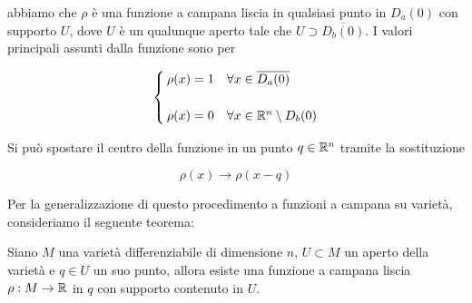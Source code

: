 abbiamo che $ \rho $ è una funzione a campana liscia in qualsiasi punto in $ D_{a}(0) $ con supporto $ U $, dove $ U $ è un qualunque aperto tale che $ U \supset \overline{D_{b}(0)} $. I valori principali assunti dalla funzione sono per

\begin{equation}
	\begin{cases}
		\rho(x) = 1 & \forall x \in \overline{D_{a}(0)}\\\\
		\rho(x) = 0 & \forall x \in \mathbb{R}^{n} \setminus D_{b}(0)
	\end{cases}
\end{equation}

Si può spostare il centro della funzione in un punto $ q \in \mathbb{R}^{n} $ tramite la sostituzione

\begin{equation}
	\rho(x) \to \rho(x-q)
\end{equation}

Per la generalizzazione di questo procedimento a funzioni a campana su varietà, consideriamo il seguente teorema:

\begin{theorem}\label{bump-fun}
	Siano $ M $ una varietà differenziabile di dimensione $ n $, $ U \subset M $ un aperto della varietà e $ q \in U $ un suo punto, allora esiste una funzione a campana liscia $ \rho : M \to \mathbb{R} $ in $ q $ con supporto contenuto in $ U $.
\end{theorem}


